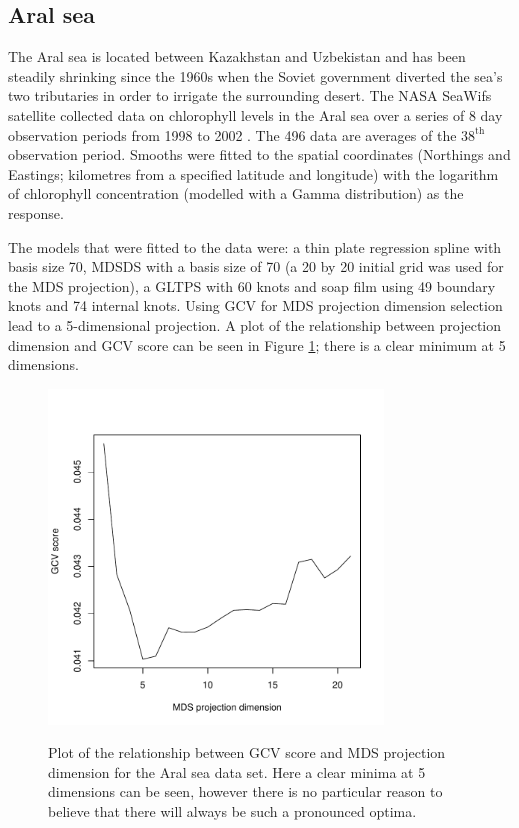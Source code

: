 \documentclass[smallextended]{svjour3}       %
\begin{document}
\subsection{Aral sea}

The Aral sea is located between Kazakhstan and Uzbekistan and has been steadily shrinking since the 1960s when the Soviet government diverted the sea's two tributaries in order to irrigate the surrounding desert. The NASA SeaWifs satellite collected data on chlorophyll levels in the Aral sea over a series of 8 day observation periods from 1998 to 2002 \citep{Wood:2008vo}. The 496 data are averages of the $38^\text{th}$ observation period. Smooths were fitted to the spatial coordinates (Northings and Eastings; kilometres from a specified latitude and longitude) with the logarithm of chlorophyll concentration (modelled with a Gamma distribution) as the response.

The models that were fitted to the data were: a thin plate regression spline with basis size 70, MDSDS with a basis size of 70 (a 20 by 20 initial grid was used for the MDS projection), a GLTPS with 60 knots and soap film using 49 boundary knots and 74 internal knots. Using GCV for MDS projection dimension selection lead to a 5-dimensional projection. A plot of the relationship between projection dimension and GCV score can be seen in Figure \ref{aral-gcvplot}; there is a clear minimum at 5 dimensions.

\begin{figure}
\centering
\includegraphics[width=3.5in]{examples/aral/aral-gcvplot.pdf} \\
\caption{Plot of the relationship between GCV score and MDS projection dimension for the Aral sea data set. Here a clear minima at 5 dimensions can be seen, however there is no particular reason to believe that there will always be such a pronounced optima.}
\label{aral-gcvplot}
\end{figure}
\end{document}
